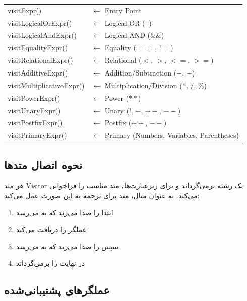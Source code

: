 \documentclass[12pt]{report}
\begin{document}
	\begin{latin}
		\begin{tabular}{ll}
			visitExpr()                    & $\leftarrow$ Entry Point \\
			visitLogicalOrExpr()          & $\leftarrow$ Logical OR ($||$) \\
			visitLogicalAndExpr()         & $\leftarrow$ Logical AND ($\&\&$) \\
			visitEqualityExpr()           & $\leftarrow$ Equality ($==$, $!=$) \\
			visitRelationalExpr()         & $\leftarrow$ Relational ($<$, $>$, $<=$, $>=$) \\
			visitAdditiveExpr()           & $\leftarrow$ Addition/Subtraction ($+$, $-$) \\
			visitMultiplicativeExpr()     & $\leftarrow$ Multiplication/Division ($*$, $/$, $\%$) \\
			visitPowerExpr()              & $\leftarrow$ Power ($**$) \\
			visitUnaryExpr()              & $\leftarrow$ Unary ($!$, $-$, $++$, $--$) \\
			visitPostfixExpr()            & $\leftarrow$ Postfix ($++$, $--$) \\
			visitPrimaryExpr()            & $\leftarrow$ Primary (Numbers, Variables, Parentheses) \\
		\end{tabular}
	\end{latin}
	
	\subsection{نحوه اتصال متدها}
	
	هر متد Visitor یک رشته برمی‌گرداند و برای زیرعبارت‌ها، متد  مناسب را فراخوانی می‌کند. به عنوان مثال، متد  برای ترجمه  به این صورت عمل می‌کند:
	
	\begin{enumerate}
		\item ابتدا  را صدا می‌زند که به  می‌رسد
		\item عملگر  را دریافت می‌کند
		\item سپس  را صدا می‌زند که به  می‌رسد
		\item در نهایت  را برمی‌گرداند
	\end{enumerate}
	
	\subsection{عملگرهای پشتیبانی‌شده}
	
\end{document}
